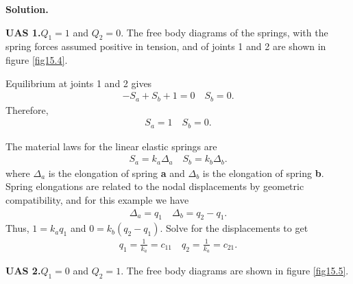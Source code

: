 \documentclass{AeroStructure-ERJohnson}
\begin{document}
\begin{example}
\pagebreak

\noindent\textbf{Solution.}

\noindent\textbf{UAS 1.}\enskip $Q_{1}=1$ and $Q_{2}=0$. The free body diagrams of the springs, with the spring forces assumed positive in tension, and of joints 1 and 2 are shown in figure \ref{fig15.4}.

\vspace*{-7pt}

{\def\thefigure{15.5}
}

\vspace*{-7pt}

Equilibrium at joints 1 and 2 gives
\begin{align}\label{ex15.1b}
-S_{a}+S_{b}+1=0 \quad S_{b}=0.
\end{align}
Therefore,
\begin{align}\label{ex15.1c}
S_{a}=1 \quad S_{b}=0.
\end{align}

The material laws for the linear elastic springs are
\begin{align}\label{ex15.1d}
S_{a}=k_{a} \Delta_{a} \quad S_{b}=k_{b} \Delta_{b}.
\end{align}
where $\Delta_{a}$ is the elongation of spring \textbf{a} and $\Delta_{b}$ is the elongation of spring \textbf{b}. Spring elongations are related to the nodal displacements by geometric compatibility, and for this example we have
\begin{align}\label{ex15.1e}
\Delta_{a}=q_{1} \quad \Delta_{b}=q_{2}-q_{1}.
\end{align}
\indent Thus, $1=k_{a} q_{1}$ and $0=k_{b}\left(q_{2}-q_{1}\right)$. Solve for the displacements to get
\begin{align}\label{ex15.1f}
q_{1}=\frac{1}{k_{a}}=c_{11} \quad q_{2}=\frac{1}{k_{a}}=c_{21}.
\end{align}

\noindent\textbf{UAS 2.}\enskip $Q_{1}=0$ and $Q_{2}=1$. The free body diagrams are shown in figure \ref{fig15.5}.

\vspace*{-7pt}


\end{example}
\end{document}
